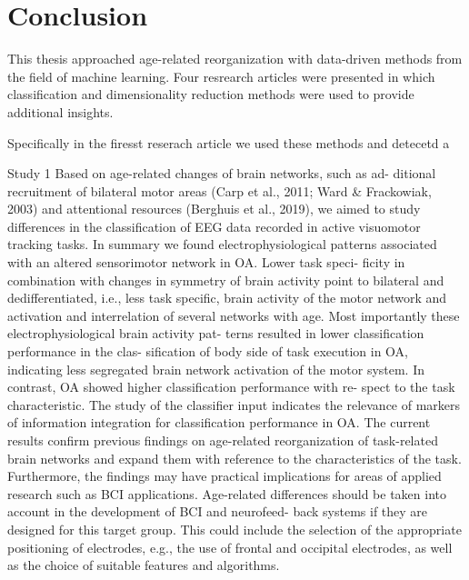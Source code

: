 \section{Conclusion}
This thesis approached age-related reorganization with data-driven methods from the field of machine learning. Four resrearch articles were presented in which classification and dimensionality reduction methods were used to provide additional insights. 




Specifically in the firesst reserach article we used these methods and detecetd a 

Study 1
Based on age-related changes of brain networks, such as ad-
ditional recruitment of bilateral motor areas (Carp et al., 2011;
Ward & Frackowiak, 2003) and attentional resources (Berghuis
et al., 2019), we aimed to study differences in the classification
of EEG data recorded in active visuomotor tracking tasks.
In summary we found electrophysiological patterns associated
with an altered sensorimotor network in OA. Lower task speci-
ficity in combination with changes in symmetry of brain activity
point to bilateral and dedifferentiated, i.e., less task specific, brain
activity of the motor network and activation and interrelation of
several networks with age.
Most importantly these electrophysiological brain activity pat-
terns resulted in lower classification performance in the clas-
sification of body side of task execution in OA, indicating less
segregated brain network activation of the motor system. In
contrast, OA showed higher classification performance with re-
spect to the task characteristic. The study of the classifier input
indicates the relevance of markers of information integration for
classification performance in OA.
The current results confirm previous findings on age-related
reorganization of task-related brain networks and expand them
with reference to the characteristics of the task. Furthermore,
the findings may have practical implications for areas of applied
research such as BCI applications. Age-related differences should
be taken into account in the development of BCI and neurofeed-
back systems if they are designed for this target group. This could
include the selection of the appropriate positioning of electrodes,
e.g., the use of frontal and occipital electrodes, as well as the
choice of suitable features and algorithms.


